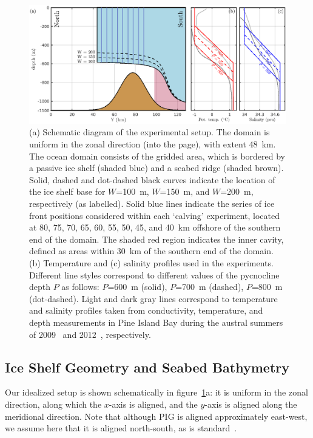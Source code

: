 \documentclass[draft]{agujournal2019}
\begin{document}
\begin{figure}
    \centering
    \includegraphics[width = \textwidth]{../make_figures/plots/figure2.eps}
    \caption{(a) Schematic diagram of the experimental setup. The domain is uniform in the zonal direction (into the page), with extent 48~km. The ocean domain consists of the gridded area, which is bordered by a passive ice shelf (shaded blue) and a seabed ridge (shaded brown). Solid, dashed and dot-dashed black curves indicate the location of the ice shelf base for $W$=100~m, $W$=150~m, and $W$=200~m, respectively (as labelled). Solid blue lines indicate the series of ice front positions considered within each `calving' experiment, located at 80, 75, 70, 65, 60, 55, 50, 45, and 40~km offshore of the southern end of the domain. The shaded red region indicates the inner cavity, defined as areas within 30~km of the southern end of the domain. (b) Temperature and (c) salinity profiles used in the experiments. Different line styles correspond to different values of the pycnocline depth $P$ as follows: $P$=600~m (solid), $P$=700~m (dashed), $P$=800~m (dot-dashed). Light and dark gray lines correspond to temperature and salinity profiles taken from conductivity, temperature, and depth measurements in Pine Island Bay during the austral summers of 2009~\cite{Jacobs2011NatureGeosci} and 2012~\cite{Dutrieux2014Science}, respectively.}
    \label{fig:figure2}
\end{figure}

\subsection{Ice Shelf Geometry and Seabed Bathymetry}\label{S:Experiment:Geometry}
Our idealized setup is shown schematically in figure~\ref{fig:figure2}a: it is uniform in the zonal direction, along which the $x$-axis is aligned, and the $y$-axis is aligned along the meridional direction. Note that although PIG is aligned approximately east-west, we assume here that it is aligned north-south, as is standard~\cite{Grosfeld1997JGROceans, DeRydt2014JGeophysResOceans}.
\end{document}
